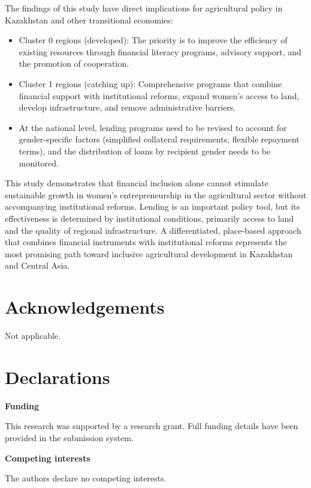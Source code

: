 ﻿\documentclass[pdflatex,sn-mathphys-ay]{sn-jnl}
\begin{document}
The findings of this study have direct implications for agricultural
policy in Kazakhstan and other transitional economies:

\begin{itemize}
\item Cluster 0 regions (developed): The priority is to improve the
efficiency of existing resources through financial literacy programs,
advisory support, and the promotion of cooperation.
\item Cluster 1 regions (catching up): Comprehensive programs that
combine financial support with institutional reforms, expand women's
access to land, develop infrastructure, and remove administrative
barriers.
\item At the national level, lending programs need to be revised to
account for gender-specific factors (simplified collateral
requirements, flexible repayment terms), and the distribution of loans by
recipient gender needs to be monitored.
\end{itemize}

This study demonstrates that financial inclusion alone cannot stimulate
sustainable growth in women's entrepreneurship in the agricultural
sector without accompanying institutional reforms. Lending is an
important policy tool, but its effectiveness is determined by
institutional conditions, primarily access to land and the quality of
regional infrastructure. A differentiated, place-based approach that
combines financial instruments with institutional reforms represents the
most promising path toward inclusive agricultural development in
Kazakhstan and Central Asia.

\backmatter

\section*{Acknowledgements}

Not applicable.

\section*{Declarations}

\medskip
\noindent\textbf{Funding}

This research was supported by a research grant. Full funding details
have been provided in the submission system.

\medskip
\noindent\textbf{Competing interests}

The authors declare no competing interests.
\end{document}
